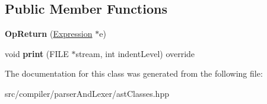 \subsection*{Public Member Functions}
\begin{DoxyCompactItemize}
\item 
{\bfseries Op\+Return} (\hyperlink{classslang__AST__NODES_1_1Expression}{Expression} $\ast$e)\hypertarget{classslang__AST__NODES_1_1OpReturn_a2338b3b04ae0ee23736ece5d04d8d121}{}\label{classslang__AST__NODES_1_1OpReturn_a2338b3b04ae0ee23736ece5d04d8d121}

\item 
void {\bfseries print} (F\+I\+LE $\ast$stream, int indent\+Level) override\hypertarget{classslang__AST__NODES_1_1OpReturn_aa76bf80d86ada5e7cd269d2dc34a9ad4}{}\label{classslang__AST__NODES_1_1OpReturn_aa76bf80d86ada5e7cd269d2dc34a9ad4}

\end{DoxyCompactItemize}


The documentation for this class was generated from the following file\+:\begin{DoxyCompactItemize}
\item 
src/compiler/parser\+And\+Lexer/ast\+Classes.\+hpp\end{DoxyCompactItemize}
